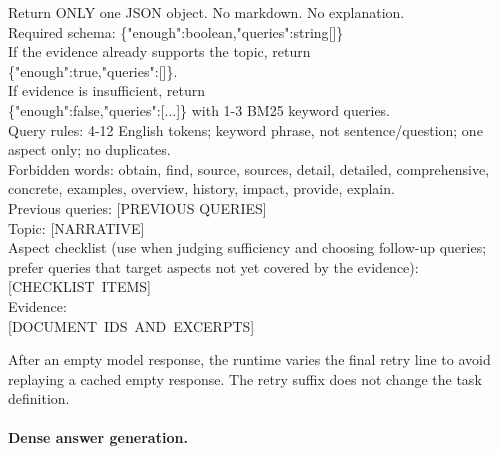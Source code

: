 \begingroup
\footnotesize\ttfamily\raggedright
Return ONLY one JSON object. No markdown. No explanation.\\
Required schema:
\{"enough":boolean,"queries":string[]\}\\
If the evidence already supports the topic, return\\
\{"enough":true,"queries":[]\}.\\
If evidence is insufficient, return\\
\{"enough":false,"queries":[...]\} with 1-3 BM25 keyword queries.\\
Query rules: 4-12 English tokens; keyword phrase, not sentence/question;
one aspect only; no duplicates.\\
Forbidden words: obtain, find, source, sources, detail, detailed,
comprehensive, concrete, examples, overview, history, impact, provide,
explain.\\
Previous queries: [PREVIOUS QUERIES]\\
Topic: [NARRATIVE]\\
Aspect checklist (use when judging sufficiency and choosing follow-up
queries; prefer queries that target aspects not yet covered by the
evidence):\\
\mbox{[CHECKLIST ITEMS]}\\
Evidence:\\
\mbox{[DOCUMENT IDS AND EXCERPTS]}
\par\endgroup

After an empty model response, the runtime varies the final retry line
to avoid replaying a cached empty response. The retry suffix does not
change the task definition.

\paragraph{Dense answer generation.}


